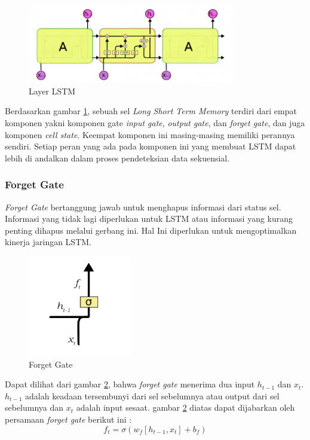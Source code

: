 \documentclass[./skripsi.tex]{subfiles}
\begin{document}
\begin{figure}%
    \centering
    \includegraphics[width=0.8\textwidth]{public/assets/img/LSTM1.png}
    \caption{Layer LSTM}
    \label{fig:lstm1}
\end{figure}

\par Berdasarkan gambar \ref{fig:lstm1}, sebuah sel \textit{Long Short Term Memory} terdiri dari empat komponen yakni komponen gate \textit{input gate}, \textit{output gate}, dan \textit{forget gate}, dan juga komponen \textit{cell state}. Keempat komponen ini masing-masing memiliki perannya sendiri. Setiap peran yang ada pada komponen ini yang membuat LSTM dapat lebih di andalkan dalam proses pendeteksian data sekuensial.

\subsubsection{Forget Gate}\label{bab2:lstmforgetgate}
\par \textit{Forget Gate} bertanggung jawab untuk menghapus informasi dari status sel. Informasi yang tidak lagi diperlukan untuk LSTM atau informasi yang kurang penting dihapus melalui gerbang ini. Hal Ini diperlukan untuk mengoptimalkan kinerja jaringan LSTM.

\begin{figure}%
    \centering
    \includegraphics[width=0.4\textwidth]{public/assets/img/ForgetGate1.png}
    \caption{Forget Gate}
    \label{fig:lstm_forget_gate}
\end{figure}
\par Dapat dilihat dari gambar \ref{fig:lstm_forget_gate}, bahwa \textit{forget gate} menerima dua input $h_{t-1}$ dan $x_t$.  $h_{t-1}$ adalah keadaan tersembunyi dari sel sebelumnya atau output dari sel sebelumnya dan $x_t$ adalah input sesaat. gambar \ref{fig:lstm_forget_gate} diatas dapat dijabarkan oleh persamaan \textit{forget gate} berikut ini :
\begin{equation}
    f_t = \sigma (w_f[h_{t-1},x_t]+b_f)
    \label{eq:lstm_forget_gate}
\end{equation}
\end{document}
